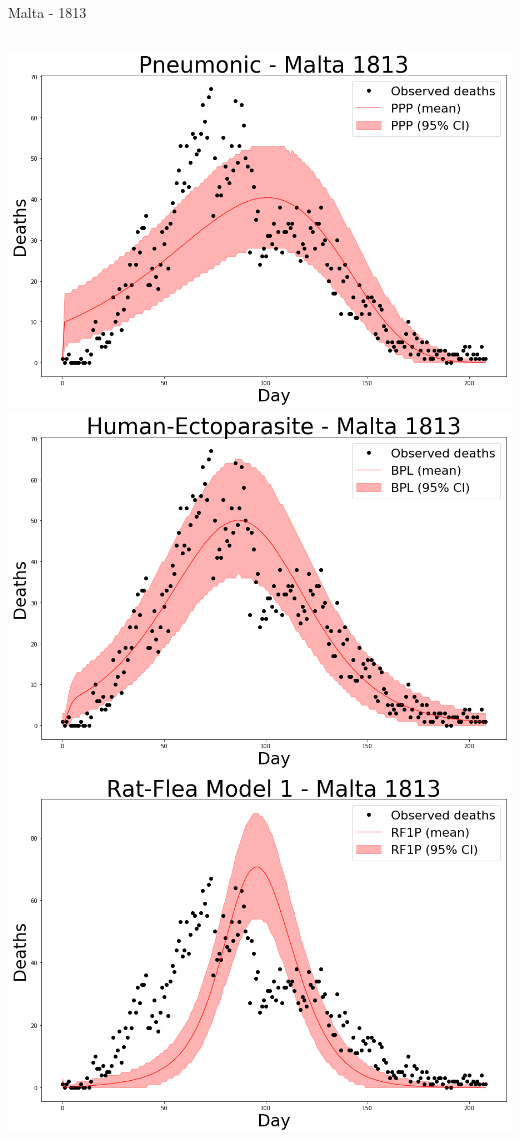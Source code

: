 \documentclass[t,10pt,fleqn]{beamer}
\begin{document}
\begin{frame}{Malta - 1813}
	\vspace{-.2cm}
	\begin{columns}
		\centering
		\includegraphics[width=\linewidth]{pneum/malta-40-30-22-15x10}
		\includegraphics[width=\linewidth]{h_ecto/malta-40-30-22-15x10}
		\centering
		\includegraphics[width=\linewidth]{rats1/malta-40-30-22-15x10}

\end{columns}
\end{frame}
\end{document}
